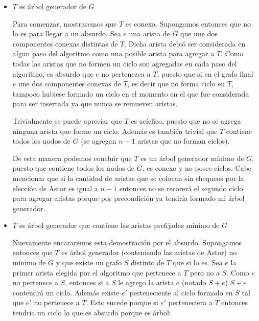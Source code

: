 \documentclass[a4paper,11pt] {article}
\begin{document}
\begin{itemize}
\item $T$ es \'arbol generador de $G$

Para comenzar, mostraremos que $T$ es conexo. Supongamos entonces que no lo es para llegar a un absurdo. Sea $e$ una arista de $G$ que une dos componentes conexas distintas de $T$. Dicha arista debi\'o ser considerada en algun paso del algoritmo como una posible arista para agregar a $T$. Como todas las aristas que no formen un ciclo son agregadas en cada paso del algoritmo, es absurdo que $e$ no pertenezca a $T$, puesto que si en el grafo final $e$ une dos componentes conexas de $T$, es decir que no forma ciclo en $T$, tampoco hubiese formado un ciclo en el momento en el que fue considerada para ser insertada ya que nunca se remueven aristas.

Trivialmente se puede apreciar que $T$ es ac\'iclico, puesto que no se agrega ninguna arista que forme un ciclo. Adem\'as es tambi\'en trivial que $T$ contiene todos los nodos de $G$ (se agregan $n-1$ aristas que no forman ciclos).

De esta manera podemos concluir que $T$ es un \'arbol generador m\'inimo de $G$, puesto que contiene todos los nodos de $G$, es conexo y no posee ciclos. Cabe mencionar que si la cantidad de aristas que se colocan sin chequeos por la elecci\'on de Astor es igual a $n-1$ entonces no se recorer\'a el segundo ciclo para agregar aristas porque por precondici\'on ya tendr\'ia formado mi \'arbol generador.

\item $T$ es \'arbol generador que contiene las aristas prefijadas m\'inimo de $G$

Nuevamente encararemos esta demostraci\'on por el absurdo. Supongamos entonces que $T$ es \'arbol generador (conteniendo las aristas de Astor) no m\'inimo de $G$ y que existe un grafo $S$ distinto de $T$ que si lo es. Sea $e$ la primer arista elegida por el algoritmo que pertenece a $T$ pero no a $S$. Como $e$ no pertenece a $S$, entonces si a $S$ le agrego la arista $e$ (notado $S+e$) $S+e$ contendr\'a un ciclo. Adem\'as existe $e'$ perteneciente al ciclo formado en $S$ tal que $e'$ no pertenece a $T$. Esto sucede porque si $e'$ perteneciera a $T$ entonces tendria un ciclo lo que es absurdo porque es \'arbol:



\end{itemize}
\end{document}
